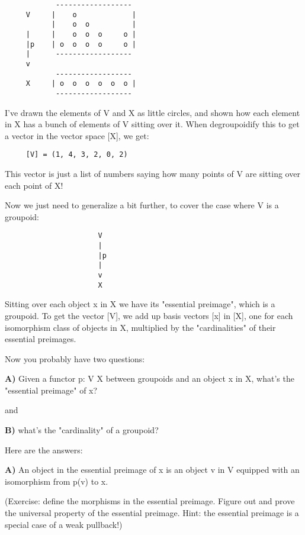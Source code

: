 \begin{verbatim}
            ------------------
     V     |    o             |
           |    o  o          |
     |     |    o  o  o     o |   
     |p    | o  o  o  o     o |
     |      ------------------
     v
            ------------------
     X     | o  o  o  o  o  o |
            ------------------
\end{verbatim}
    
I've drawn the elements of V and X as little circles, and shown how 
each element in X has a bunch of elements of V sitting over it.  When 
degroupoidify this to get a vector in the vector space [X], we get:

\begin{verbatim}
     [V] = (1, 4, 3, 2, 0, 2)
\end{verbatim}
    
This vector is just a list of numbers saying how many points of V 
are sitting over each point of X!

Now we just need to generalize a bit further, to cover the case
where V is a groupoid:

\begin{verbatim}
                      V
                      |
                      |p
                      |
                      v
                      X
\end{verbatim}
    
Sitting over each object x in X we have its "essential preimage",
which is a groupoid.  To get the vector [V], we add up basis 
vectors [x] in [X], one for each isomorphism class of objects 
in X, multiplied by the "cardinalities" of their essential preimages.

Now you probably have two questions: 

\textbf{A)} Given a functor p: V \to  X between groupoids and an object
x in X, what's the "essential preimage" of x?

and 

\textbf{B)} what's the "cardinality" of a groupoid?

Here are the answers:

\textbf{A)} An object in the essential preimage of x is an object 
v in V equipped with an isomorphism from p(v) to x.                        

(Exercise: define the morphisms in the essential preimage.
Figure out and prove the universal property of the essential
preimage.  Hint: the essential preimage is a special case of a
weak pullback!)

